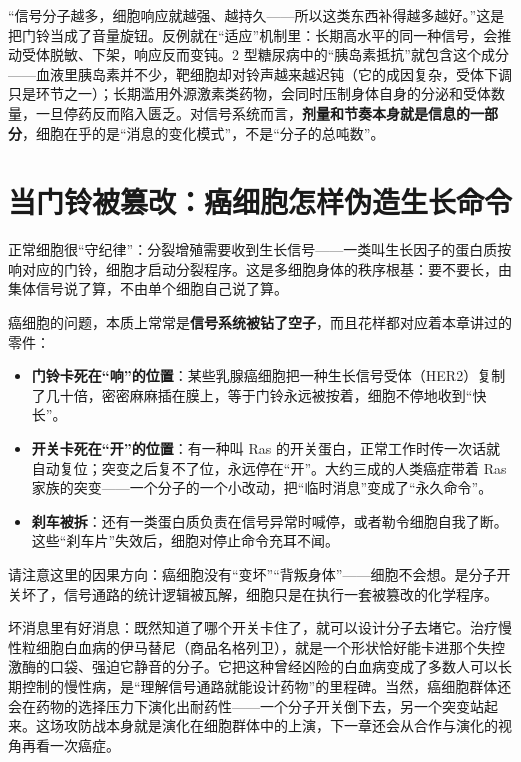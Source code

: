 \begin{wuqu}
“信号分子越多，细胞响应就越强、越持久——所以这类东西补得越多越好。”这是把门铃当成了音量旋钮。反例就在“适应”机制里：长期高水平的同一种信号，会推动受体脱敏、下架，响应反而变钝。2 型糖尿病中的“胰岛素抵抗”就包含这个成分——血液里胰岛素并不少，靶细胞却对铃声越来越迟钝（它的成因复杂，受体下调只是环节之一）；长期滥用外源激素类药物，会同时压制身体自身的分泌和受体数量，一旦停药反而陷入匮乏。对信号系统而言，\textbf{剂量和节奏本身就是信息的一部分}，细胞在乎的是“消息的变化模式”，不是“分子的总吨数”。
\end{wuqu}

\section{当门铃被篡改：癌细胞怎样伪造生长命令}

正常细胞很“守纪律”：分裂增殖需要收到生长信号——一类叫生长因子的蛋白质按响对应的门铃，细胞才启动分裂程序。这是多细胞身体的秩序根基：要不要长，由集体信号说了算，不由单个细胞自己说了算。

癌细胞的问题，本质上常常是\textbf{信号系统被钻了空子}，而且花样都对应着本章讲过的零件：

\begin{itemize}[itemsep=2pt]
\item \textbf{门铃卡死在“响”的位置}：某些乳腺癌细胞把一种生长信号受体（HER2）复制了几十倍，密密麻麻插在膜上，等于门铃永远被按着，细胞不停地收到“快长”。
\item \textbf{开关卡死在“开”的位置}：有一种叫 Ras 的开关蛋白，正常工作时传一次话就自动复位；突变之后复不了位，永远停在“开”。大约三成的人类癌症带着 Ras 家族的突变——一个分子的一个小改动，把“临时消息”变成了“永久命令”。
\item \textbf{刹车被拆}：还有一类蛋白质负责在信号异常时喊停，或者勒令细胞自我了断。这些“刹车片”失效后，细胞对停止命令充耳不闻。
\end{itemize}

请注意这里的因果方向：癌细胞没有“变坏”“背叛身体”——细胞不会想。是分子开关坏了，信号通路的统计逻辑被瓦解，细胞只是在执行一套被篡改的化学程序。

坏消息里有好消息：既然知道了哪个开关卡住了，就可以设计分子去堵它。治疗慢性粒细胞白血病的伊马替尼（商品名格列卫），就是一个形状恰好能卡进那个失控激酶的口袋、强迫它静音的分子。它把这种曾经凶险的白血病变成了多数人可以长期控制的慢性病，是“理解信号通路就能设计药物”的里程碑。当然，癌细胞群体还会在药物的选择压力下演化出耐药性——一个分子开关倒下去，另一个突变站起来。这场攻防战本身就是演化在细胞群体中的上演，下一章还会从合作与演化的视角再看一次癌症。

